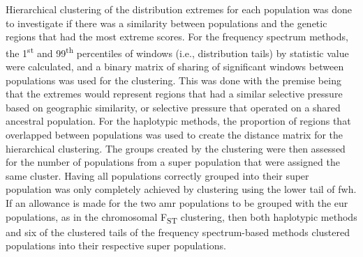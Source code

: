 \documentclass[]{report}
\begin{document}
Hierarchical clustering of the distribution extremes for each population
was done to investigate if there was a similarity between populations
and the genetic regions that had the most extreme scores. For the
frequency spectrum methods, the 1\textsuperscript{st} and
99\textsuperscript{th} percentiles of windows (i.e., distribution tails)
by statistic value were calculated, and a binary matrix of sharing of
significant windows between populations was used for the clustering.
This was done with the premise being that the extremes would represent
regions that had a similar selective pressure based on geographic
similarity, or selective pressure that operated on a shared ancestral
population. For the haplotypic methods, the proportion of regions that
overlapped between populations was used to create the distance matrix
for the hierarchical clustering. The groups created by the clustering
were then assessed for the number of populations from a super population
that were assigned the same cluster. Having all populations correctly
grouped into their super population was only completely achieved by
clustering using the lower tail of \gls{fwh}. If an allowance is made
for the two \gls{amr} populations to be grouped with the \gls{eur}
populations, as in the chromosomal F\textsubscript{ST} clustering, then
both haplotypic methods and six of the clustered tails of the frequency
spectrum-based methods clustered populations into their respective super
populations.
\end{document}
